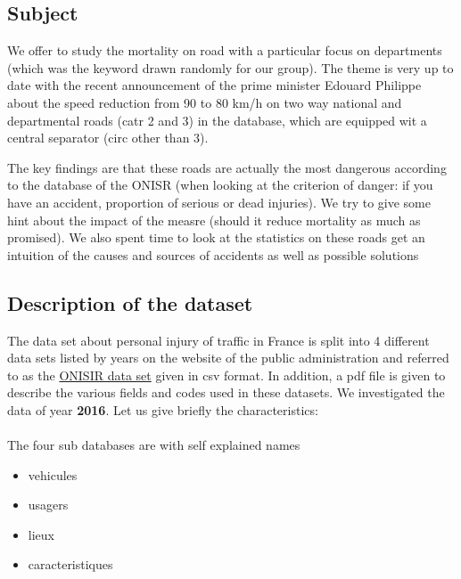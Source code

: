 \documentclass[a4paper]{article}
\theoremstyle{definition}
\theoremstyle{proposition}
\begin{document}
\subsection{Subject}
We offer to study the mortality on road with a particular focus on departments (which was the keyword drawn randomly for our group). The theme is very up to date with the recent announcement of the prime minister Edouard Philippe about the speed reduction from 90 to 80 km/h on two way national and departmental roads (catr 2 and 3) in the database, which are equipped wit a central separator (circ other than 3).

The key findings are that these roads are actually the most dangerous according to the database of the ONISR (when looking at the criterion of danger: if you have an accident, proportion of serious or dead injuries). We try to give some hint about the impact of the measre (should it reduce mortality as much as promised). We also spent time to look at the statistics on these roads get an intuition of the causes and sources of accidents as well as possible solutions

\subsection{Description of the dataset}
The data set about personal injury of traffic in France is split into 4 different data sets listed by years on the website of the public administration and referred to as the  \href{https://www.data.gouv.fr/fr/datasets/base-de-donnees-accidents-corporels-de-la-circulation/}{ONISIR data set} given in csv format. In addition, a pdf file is given to describe the various fields and codes used in these datasets. We investigated the data of year \textbf{2016}. Let us give briefly the characteristics:
\\
\\
The four sub databases are with self explained names
\begin{itemize}
\item vehicules
\item usagers
\item lieux
\item caracteristiques
\end{itemize}
\end{document}
